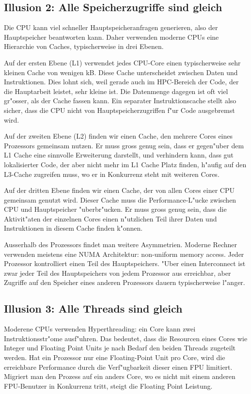 \subsection{Illusion 2: Alle Speicherzugriffe sind gleich}
Die CPU kann viel schneller Hauptspeicheranfragen generieren, also der
Hauptspeicher beantworten kann.
Daher verwenden moderne CPUs eine Hierarchie von Caches, typischerweise
in drei Ebenen.

Auf der ersten Ebene (L1) verwendet
jedes CPU-Core einen typischerweise sehr kleinen Cache von wenigen
kB. Diese Cache unterscheidet zwischen Daten und Instruktionen.
Dies lohnt sich, weil gerade auch im HPC-Bereich der Code, der die
Hauptarbeit leistet, sehr kleine ist. Die Datenmenge dagegen ist oft
viel gr"osser, als der Cache fassen kann.
Ein separater Instruktionscache
stellt also sicher, dass die CPU nicht von Hauptspeicherzugriffen f"ur
Code ausgebremst wird.

Auf der zweiten Ebene (L2) finden wir einen Cache, den mehrere Cores eines
Prozessors gemeinsam nutzen.
Er muss gross genug sein, dass er gegen"uber
dem L1 Cache eine sinnvolle Erweiterung darstellt, und verhindern kann,
dass gut lokalisierter Code, der aber nicht mehr im L1 Cache Platz finden,
h"aufig auf den L3-Cache zugreifen muss, wo er in Konkurrenz steht mit
weiteren Cores.

Auf der dritten Ebene finden wir einen Cache, der von allen Cores einer
CPU gemeinsam genutzt wird. Dieser Cache muss die Performance-L"ucke
zwischen CPU und Hauptspeicher "uberbr"ucken.
Er muss gross genug sein, dass die Aktivit"aten der einzelnen Cores einen
n"utzlichen Teil ihrer Daten und Instruktionen in diesem Cache finden 
k"onnen. 

Ausserhalb des Prozessors findet man weitere Asymmetrien.
Moderne Rechner verwenden meistens eine NUMA Architektur: non-uniform
memory access.
Jeder Prozessor kontrolliert einen Teil des Hauptspeichers.
"Uber einen Interconnect ist zwar jeder Teil des Hauptspeichers
von jedem Prozessor aus erreichbar, aber Zugriffe auf den
Speicher eines anderen Prozessors dauern typischerweise l"anger.

\subsection{Illusion 3: Alle Threads sind gleich}
Moderene CPUs verwenden Hyperthreading: ein Core kann zwei Instruktionsstr"ome
ausf"uhren.
Das bedeutet, dass die Resourcen eines Cores wie Integer und
Floating Point Units je nach Bedarf den beiden Threads zugeteilt werden.
Hat ein Prozessor nur eine Floating-Point Unit pro Core, wird die
erreichbare Performance durch die Verf"ugbarkeit dieser einen FPU
limitiert.
Migriert man den Prozess auf ein anders Core, wo es nicht mit einem anderen
FPU-Benutzer in Konkurrenz tritt, steigt die Floating Point Leistung.

